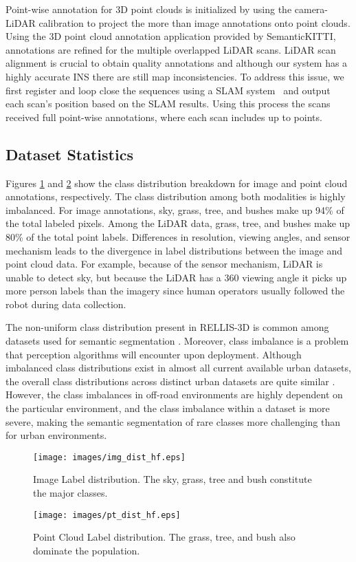 \documentclass[letterpaper, 10 pt, conference]{ieeeconf}
\begin{document}
Point-wise annotation for 3D point clouds is initialized by using the camera-LiDAR calibration to project the more than  image annotations onto point clouds. Using the 3D point cloud annotation application provided by SemanticKITTI\cite{behley2019iccv}, annotations are refined for the multiple overlapped LiDAR scans. LiDAR scan alignment is crucial to obtain quality annotations and although our system has a highly accurate INS there are still map inconsistencies. To address this issue, we first register and loop close the sequences using a SLAM system~\cite{ Maturana2015} and output each scan's position based on the SLAM results. Using this process the  scans received full point-wise annotations, where each scan includes up to  points.
\subsection{Dataset Statistics}
Figures \ref{fig:img_dist} and \ref{fig:pt_dist} show the class distribution breakdown for image and point cloud annotations, respectively. The class distribution among both modalities is highly imbalanced. For image annotations, sky, grass, tree, and bushes make up 94\% of the total labeled pixels. Among the LiDAR data, grass, tree, and bushes make up 80\% of the total point labels. Differences in resolution, viewing angles, and sensor mechanism leads to the divergence in label distributions between the image and point cloud data. For example, because of the sensor mechanism, LiDAR is unable to detect sky, but because the LiDAR has a 360 viewing angle it picks up more person labels than the imagery since human operators usually followed the robot during data collection.

The non-uniform class distribution present in RELLIS-3D is common among datasets used for semantic segmentation \cite{Feng2020, Neuhold2017, behley2019iccv}. Moreover, class imbalance is a problem that perception algorithms will encounter upon deployment.
Although imbalanced class distributions exist in almost all current available urban datasets, the overall class distributions across distinct urban datasets are quite similar \cite{behley2019iccv, Neuhold2017}. However, the class imbalances in off-road environments are highly dependent on the particular environment, and the class imbalance within a dataset is more severe, making the semantic segmentation of rare classes more challenging than for urban environments. 
\begin{figure}
  \centering
  \texttt{[image: images/img\_dist\_hf.eps]}
  \caption{Image Label distribution. The sky, grass, tree and bush constitute the major classes.}
  \label{fig:img_dist}
\end{figure} \begin{figure}
  \centering
  \texttt{[image: images/pt\_dist\_hf.eps]}
  \caption{Point Cloud Label distribution. The grass, tree, and bush also dominate the population.}
  \label{fig:pt_dist}
\end{figure} %
\end{document}
